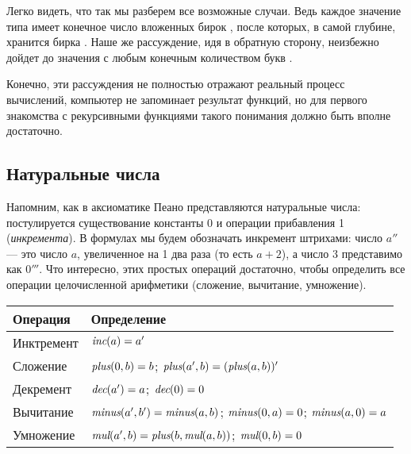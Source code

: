 Легко видеть, что так мы разберем все возможные случаи. Ведь каждое 
значение типа  имеет конечное число вложенных бирок , после 
которых, в самой глубине, хранится бирка . Наше же рассуждение, 
идя в обратную сторону, неизбежно дойдет до значения с любым конечным 
количеством букв .

Конечно, эти рассуждения не полностью отражают реальный процесс вычислений, 
компьютер не запоминает результат функций, но для первого знакомства с 
рекурсивными функциями такого понимания должно быть вполне достаточно.

\subsection{Натуральные числа}

Напомним, как в аксиоматике Пеано представляются натуральные числа:
постулируется существование константы 0 и операции прибавления 1 
(\emph{инкремента}). 
В формулах мы будем обозначать инкремент штрихами:
число $a''$ --- это число $a$, увеличенное на 1 два раза (то есть $a + 2$), 
а число $3$ представимо как $0'''$. 
Что интересно, этих простых операций достаточно, чтобы определить все 
операции целочисленной арифметики (сложение, вычитание, 
умножение).

\begin{tabular}{ll}\\
\hline
Операция&Определение\\
\hline
Инктремент&$\textit{inc} (a) = a'$\\
Сложение&$\textit{plus} (0,b) = b$; $\textit{plus} (a',b) = (\textit{plus} (a,b))'$\\
Декремент&$\textit{dec} (a') = a$; $\textit{dec} (0) = 0$\\
Вычитание&$\textit{minus} (a',b') = \textit{minus} (a,b)$; $\textit{minus} (0,a) = 0$; $\textit{minus} (a,0) = a$\\
Умножение&$\textit{mul} (a',b) = \textit{plus} (b, \textit{mul} (a,b))$; $\textit{mul} (0,b) = 0$\\
\hline
\end{tabular}

